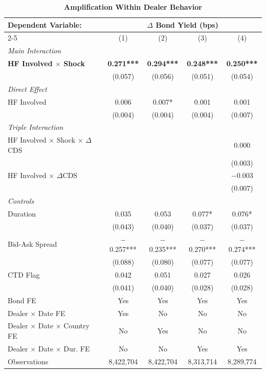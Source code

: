 \documentclass[english, 11pt, oneside]{article}
\begin{document}
\begin{table}[t]
\centering
\caption{\textbf{Amplification Within Dealer Behavior}}
\footnotesize
\setlength{\tabcolsep}{8pt}
\renewcommand{\arraystretch}{1.1}
\begin{tabular}{l c c c c}
\toprule
\textbf{Dependent Variable:} & \multicolumn{4}{c}{\textbf{$\Delta$ Bond Yield (bps)}} \\
\cmidrule(lr){2-5}
 & (1) & (2) & (3) & (4) \\
\midrule
\textit{Main Interaction} & & & & \\
\textbf{HF Involved $\times$ Shock} & \textbf{0.271***} & \textbf{0.294***} & \textbf{0.248***} & \textbf{0.250***} \\
 & (0.057) & (0.056) & (0.051) & (0.054) \\
\addlinespace
\textit{Direct Effect} & & & & \\
HF Involved & 0.006 & 0.007* & 0.001 & 0.001 \\
 & (0.004) & (0.004) & (0.004) & (0.007) \\
\addlinespace
\textit{Triple Interaction} & & & & \\
HF Involved $\times$ Shock $\times$ $\Delta$CDS & & & & 0.000 \\
 & & & & (0.003) \\
HF Involved $\times$ $\Delta$CDS & & & & $-$0.003 \\
 & & & & (0.007) \\
\addlinespace
\textit{Controls} & & & & \\
Duration & 0.035 & 0.053 & 0.077* & 0.076* \\
 & (0.043) & (0.040) & (0.037) & (0.037) \\
Bid-Ask Spread & $-$0.257*** & $-$0.235*** & $-$0.270*** & $-$0.274*** \\
 & (0.088) & (0.080) & (0.077) & (0.077) \\
CTD Flag & 0.042 & 0.051 & 0.027 & 0.026 \\
 & (0.041) & (0.040) & (0.028) & (0.028) \\
\midrule
Bond FE & Yes & Yes & Yes & Yes \\
Dealer $\times$ Date FE & Yes & No & No & No \\
Dealer $\times$ Date $\times$ Country FE & No & Yes & No & No \\
Dealer $\times$ Date $\times$ Dur. FE & No & No & Yes & Yes \\
\midrule
Observations & 8,422,704 & 8,422,704 & 8,313,714 & 8,289,774 \\

\end{tabular}
\end{table}
\end{document}
